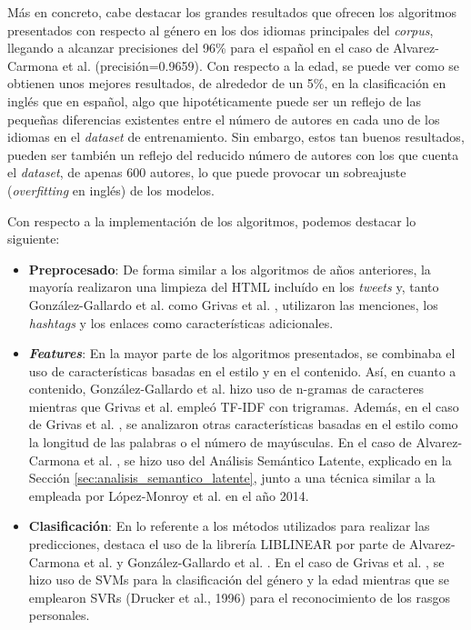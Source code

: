\bigskip
Más en concreto, cabe destacar los grandes resultados que
ofrecen los algoritmos presentados con respecto al género en los dos idiomas principales del \textit{corpus}, llegando a alcanzar
precisiones del 96\% para el español en el caso de Alvarez-Carmona et al. \cite{alvarez2015inaoe} (precisión=0.9659). Con respecto a la edad,
se puede ver como se obtienen unos mejores resultados, de alrededor de un 5\%, en la clasificación en inglés que en español, algo que
hipotéticamente puede ser un reflejo de las pequeñas diferencias existentes entre el número de autores en cada uno de los idiomas en
el \textit{dataset} de entrenamiento. Sin embargo, estos tan buenos resultados, pueden ser también un reflejo del reducido número de
autores con los que cuenta el \textit{dataset}, de apenas 600 autores, lo que puede provocar un sobreajuste (\textit{overfitting} en inglés)
de los modelos.

\bigskip
Con respecto a la implementación de los algoritmos, podemos destacar lo siguiente:

\begin{itemize}
	\item \textbf{Preprocesado}: De forma similar a los algoritmos de años anteriores, la mayoría realizaron una limpieza del HTML incluído
	      en los \textit{tweets} y, tanto González-Gallardo et al. \cite{gonzalez2015tweets} como Grivas et al. \cite{grivas2015author}, utilizaron
	      las menciones, los \textit{hashtags} y los enlaces como características adicionales.
	\item \textbf{\textit{Features}}: En la mayor parte de los algoritmos presentados, se combinaba el uso de características
	      basadas en el estilo y en el contenido. Así, en cuanto a contenido, González-Gallardo et al. \cite{gonzalez2015tweets} hizo uso de n-gramas de caracteres
	      mientras que Grivas et al. \cite{grivas2015author} empleó TF-IDF con trigramas. Además, en el caso de Grivas et al. \cite{grivas2015author},
	      se analizaron otras características basadas en el estilo como la longitud de las palabras o el número de mayúsculas. En el caso de Alvarez-Carmona et al. \cite{alvarez2015inaoe},
	      se hizo uso del Análisis Semántico Latente, explicado en la Sección \ref{sec:analisis_semantico_latente}, junto a una técnica similar a la empleada por
	      López-Monroy et al. \cite{lopez2014using} en el año 2014.
	\item \textbf{Clasificación}: En lo referente a los métodos utilizados para realizar las predicciones, destaca el uso de la librería LIBLINEAR \cite{fan2008liblinear}
	      por parte de Alvarez-Carmona et al. \cite{alvarez2015inaoe} y González-Gallardo et al. \cite{gonzalez2015tweets}. En el caso de Grivas et al. \cite{grivas2015author}, se hizo
	      uso de SVMs para la clasificación del género y la edad mientras que se emplearon SVRs (Drucker et al., 1996) \cite{drucker1996support} para el reconocimiento de los rasgos personales.
\end{itemize}

